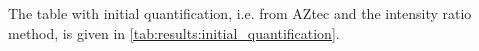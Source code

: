 The table with initial quantification, i.e. from AZtec and the intensity ratio method, is given in \cref{tab:results:initial_quantification}.







